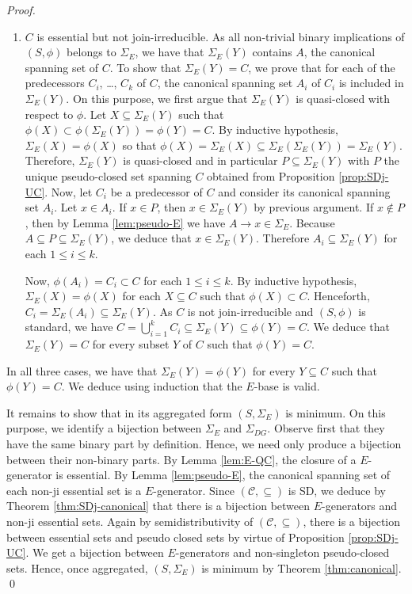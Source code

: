 \documentclass[12pt, a4paper]{article}
\def\arxiv{1}
\newcommand{\cc}[1]{\mathcal{#1}}  %
\newcommand{\U}{S}  %
\newcommand{\cl}{\phi}  %
\newcommand{\cs}{\cc{C}} %
\newcommand{\imp}{\rightarrow}  %
\newcommand{\is}{\Sigma}  %
\begin{document}
\begin{proof}
\begin{enumerate}[(1)]
\item $C$ is essential but not join-irreducible.
As all non-trivial binary implications of $(\U, \cl)$ belongs to $\is_E$, we have that $\is_E(Y)$ contains $A$, the canonical spanning set of $C$.
To show that $\is_E(Y) = C$, we prove that for each of the predecessors $C_i$, \dots, $C_k$ of $C$, the canonical spanning set $A_i$ of $C_i$ is included in $\is_E(Y)$.
On this purpose, we first argue that $\is_E(Y)$ is quasi-closed with respect to $\cl$.
Let $X \subseteq \is_E(Y)$ such that $\cl(X) \subset \cl(\is_E(Y)) = \cl(Y) = C$.
By inductive hypothesis, $\is_E(X) = \cl(X)$ so that $\cl(X) = \is_E(X) \subseteq \is_E(\is_E(Y)) = \is_E(Y)$.
Therefore, $\is_E(Y)$ is quasi-closed and in particular $P \subseteq \is_E(Y)$ with $P$ the unique pseudo-closed set spanning $C$ obtained from Proposition \ref{prop:SDj-UC}.
Now, let $C_i$ be a predecessor of $C$ and consider its canonical spanning set $A_i$.
Let $x \in A_i$.
If $x \in P$, then $x \in \is_E(Y)$ by previous argument.
If $x \notin P$, then by Lemma \ref{lem:pseudo-E} we have $A \imp x \in \is_E$.
Because $A \subseteq P \subseteq \is_E(Y)$, we deduce that $x \in \is_E(Y)$.
Therefore $A_i \subseteq \is_E(Y)$ for each $1 \leq i \leq k$.

Now, $\cl(A_i) = C_i \subset C$ for each $1 \leq i \leq k$.
By inductive hypothesis, $\is_E(X) = \cl(X)$ for each $X \subseteq C$ such that $\cl(X) \subset C$.
Henceforth, $C_i = \is_E(A_i) \subseteq \is_E(Y)$.
As $C$ is not join-irreducible and $(\U, \cl)$ is standard, we have $C = \bigcup_{i = 1}^{k} C_i \subseteq \is_E(Y) \subseteq \cl(Y) = C$.
We deduce that $\is_E(Y) = C$ for every subset $Y$ of $C$ such that $\cl(Y) = C$.
\end{enumerate}
%
In all three cases, we have that $\is_E(Y) = \cl(Y)$ for every $Y \subseteq C$ such that $\cl(Y) = C$.
We deduce using induction that the $E$-base is valid.

It remains to show that in its aggregated form $(\U, \is_E)$ is minimum.
On this purpose, we identify a bijection between $\is_E$ and $\is_{DG}$.
Observe first that they have the same binary part by definition.
Hence, we need only produce a bijection between their non-binary parts.
By Lemma \ref{lem:E-QC}, the closure of a $E$-generator is essential.
By Lemma \ref{lem:pseudo-E}, the canonical spanning set of each non-ji essential set is a $E$-generator.
Since $(\cs, \subseteq)$ is SD, we deduce by Theorem \ref{thm:SDj-canonical} that there is a bijection between $E$-generators and non-ji essential sets.
Again by semidistributivity of $(\cs, \subseteq)$, there is a bijection between essential sets and pseudo closed sets by virtue of Proposition \ref{prop:SDj-UC}.
We get a bijection between $E$-generators and non-singleton pseudo-closed sets.
Hence, once aggregated, $(\U, \is_E)$ is minimum by Theorem \ref{thm:canonical}.
\ifx\arxiv\undefined
\qed
\fi
\end{proof}
\end{document}
